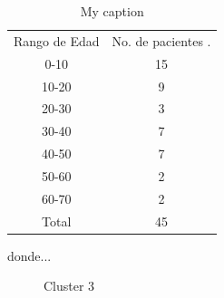 \begin{table}[]
	\centering
	\caption{My caption}
	\label{my-label}
	\begin{tabular}{@{}|c|c|@{}}
		Rango de Edad & No. de pacientes . \\ 
		0-10          & 15                 \\
		10-20         & 9                  \\
		20-30         & 3                  \\
		30-40         & 7                  \\
		40-50         & 7                  \\
		50-60         & 2                  \\ 
		60-70         & 2                  \\
		Total         & 45                 \\
	\end{tabular}
\end{table}

donde...

\begin{figure}[H]
	\centering
	\caption{Cluster 3} \label{fig:c3}
\end{figure}

